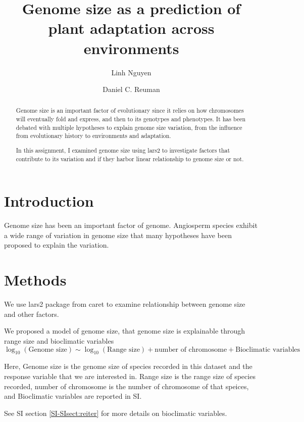 \documentclass[letterpaper,11pt]{article}
\title{Genome size as a prediction of plant adaptation across environments}
\date{}
\author[a,*]{Linh Nguyen}
\author[a]{Daniel C. Reuman}
\affil[a]{Department of Ecology and Evolutionary Biology and Center for Ecological Research, University of Kansas}
\affil[*]{Corresponding author, l233n428@ku.edu}
\begin{document}
\linenumbers

\maketitle

\begin{abstract}
\noindent Genome size is an important factor of evolutionary since it relies on how chromosomes
will eventually fold and express, and then to its genotypes and phenotypes. 
It has been debated with multiple hypotheses to explain genome size variation,
from the influence from evolutionary history to environments and adaptation. 

\noindent In this assignment, I examined genome size using lars2 to investigate factors 
that contribute to its variation and if they harbor linear relationship
to genome size or not.
\end{abstract}

\section{Introduction}\label{section:introduction}
Genome size has been an important factor of genome. Angiosperm species exhibit a wide range of variation in genome size
that many hypotheses have been proposed to explain the variation. 

\section{Methods}\label{section:methods}
We use lars2 package from caret to examine relationship between genome size and other factors.

We proposed a model of genome size, that genome size is explainable through range size and bioclimatic variables
\[ \log_{10}(\text{Genome size}) \sim \log_{10}(\text{Range size}) + \text{number of chromosome} + \text{Bioclimatic variables} \]

Here, Genome size is the genome size of species recorded in this dataset and the response variable that we are interested in.
Range size is the range size of species recorded, number of chromosome is the number of chromosome of that speices, 
and Bioclimatic variables are reported in SI. 

See SI section \ref{SI-SIsect:reiter} for more details on bioclimatic variables.
\end{document}
